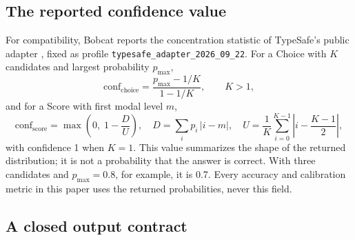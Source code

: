 \subsection{The reported confidence value}
\label{sec:confidence}

For compatibility, Bobcat reports the concentration statistic of TypeSafe's public adapter
\citep{typesafe_adapter}, fixed as profile \texttt{typesafe\_adapter\_2026\_09\_22}. For a
Choice with $K$ candidates and largest probability $p_{\max}$,
\begin{equation}
  \mathrm{conf}_{\text{choice}} = \frac{p_{\max} - 1/K}{1 - 1/K}, \qquad K > 1,
\end{equation}
and for a Score with first modal level $m$,
\begin{equation}
  \mathrm{conf}_{\text{score}} = \max\!\left(0,\; 1 - \frac{D}{U}\right), \quad
  D = \sum_i p_i\,|i-m|, \quad U = \frac{1}{K}\sum_{i=0}^{K-1}\left|i-\frac{K-1}{2}\right|,
\end{equation}
with confidence 1 when $K=1$. This value summarizes the shape of the returned distribution;
it is not a probability that the answer is correct. With three candidates and
$p_{\max}=0.8$, for example, it is 0.7. Every accuracy and calibration metric in this paper
uses the returned probabilities, never this field.

\subsection{A closed output contract}
\label{sec:contract}

